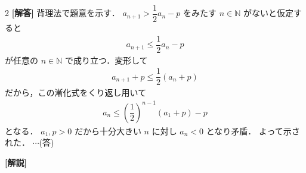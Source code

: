 \documentclass[../../main.tex]{subfiles}
\begin{document}
\setcounter{equation}{0}
\begin{oframed}
  
\end{oframed}
\setlength{\columnseprule}{0.4pt}
\begin{multicols}{2}
  {\bf [解答]}
  背理法で題意を示す．
  $a_{n+1} > \dfrac{1}{2} a_n - p$ をみたす $n \in \mathbb{N}$ がないと仮定すると
  \begin{align}
    a_{n+1} \le \dfrac{1}{2} a_n - p
  \end{align}
  が任意の $n \in \mathbb{N}$ で成り立つ．変形して
  \begin{align}
    a_{n+1} + p \le \dfrac{1}{2} (a_n + p)
  \end{align}
  だから，この漸化式をくり返し用いて
  \begin{align}
    a_n \le \left(\dfrac{1}{2}\right)^{n-1} (a_1 + p) - p
  \end{align}
  となる．
  $a_1, p > 0$ だから十分大きい $n$ に対し $a_n < 0$ となり矛盾．
  よって示された．
  $\cdots$(答)

  {\bf [解説]}

  \newpage
\end{multicols}
\end{document}
